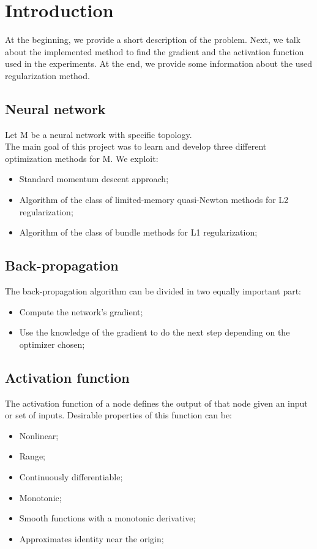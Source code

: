 \section{Introduction}
At the beginning, we provide a short description of the problem. Next, we talk about the implemented method to find the gradient and the activation function used in the experiments. At the end, we provide some information about the used regularization method.
\subsection{Neural network}
Let M be a neural network with specific topology.
\\
The main goal of this project was to learn and develop three different optimization methods for M.
We exploit:
\begin{itemize}
	\item Standard momentum descent approach;
	\item Algorithm of the class of limited-memory quasi-Newton methods for L2 regularization;
	\item Algorithm of the class of bundle methods for L1 regularization;
\end{itemize}
\subsection{Back-propagation}
The back-propagation algorithm can be divided in two equally important part:
\begin{itemize}
	\item Compute the network's gradient;
	\item Use the knowledge of the gradient to do the next step depending on the optimizer chosen;
\end{itemize}
\subsection{Activation function}
The activation function of a node defines the output of that node given an input or set of inputs. 
Desirable properties of this function can be:
\begin{itemize}
	\item Nonlinear;
	\item Range;
	\item Continuously differentiable;
	\item Monotonic;
	\item Smooth functions with a monotonic derivative;
	\item Approximates identity near the origin;
\end{itemize}

